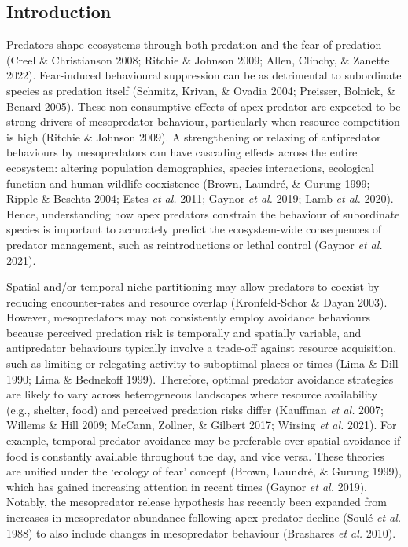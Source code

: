 \documentclass[11pt,a4paper,titlepage,twoside,openright]{style/unimelbthesis}
\begin{document}
\begin{mainmatter}
\newpage

\hypertarget{introduction-3}{%
\section{Introduction}\label{introduction-3}}

Predators shape ecosystems through both predation and the fear of predation (Creel \& Christianson 2008; Ritchie \& Johnson 2009; Allen, Clinchy, \& Zanette 2022). Fear-induced behavioural suppression can be as detrimental to subordinate species as predation itself (Schmitz, Krivan, \& Ovadia 2004; Preisser, Bolnick, \& Benard 2005). These non-consumptive effects of apex predator are expected to be strong drivers of mesopredator behaviour, particularly when resource competition is high (Ritchie \& Johnson 2009). A strengthening or relaxing of antipredator behaviours by mesopredators can have cascading effects across the entire ecosystem: altering population demographics, species interactions, ecological function and human-wildlife coexistence (Brown, Laundré, \& Gurung 1999; Ripple \& Beschta 2004; Estes \emph{et al.} 2011; Gaynor \emph{et al.} 2019; Lamb \emph{et al.} 2020). Hence, understanding how apex predators constrain the behaviour of subordinate species is important to accurately predict the ecosystem-wide consequences of predator management, such as reintroductions or lethal control (Gaynor \emph{et al.} 2021).

Spatial and/or temporal niche partitioning may allow predators to coexist by reducing encounter-rates and resource overlap (Kronfeld-Schor \& Dayan 2003). However, mesopredators may not consistently employ avoidance behaviours because perceived predation risk is temporally and spatially variable, and antipredator behaviours typically involve a trade-off against resource acquisition, such as limiting or relegating activity to suboptimal places or times (Lima \& Dill 1990; Lima \& Bednekoff 1999). Therefore, optimal predator avoidance strategies are likely to vary across heterogeneous landscapes where resource availability (e.g., shelter, food) and perceived predation risks differ (Kauffman \emph{et al.} 2007; Willems \& Hill 2009; McCann, Zollner, \& Gilbert 2017; Wirsing \emph{et al.} 2021). For example, temporal predator avoidance may be preferable over spatial avoidance if food is constantly available throughout the day, and vice versa. These theories are unified under the `ecology of fear' concept (Brown, Laundré, \& Gurung 1999), which has gained increasing attention in recent times (Gaynor \emph{et al.} 2019). Notably, the mesopredator release hypothesis has recently been expanded from increases in mesopredator abundance following apex predator decline (Soulé \emph{et al.} 1988) to also include changes in mesopredator behaviour (Brashares \emph{et al.} 2010).


\end{mainmatter}
\end{document}
